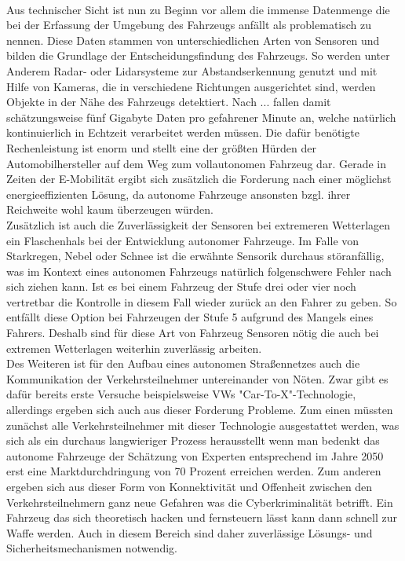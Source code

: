 \documentclass[10pt,a4paper]{article}
\begin{document}
\\
Aus technischer Sicht ist nun zu Beginn vor allem die immense Datenmenge die bei der Erfassung der Umgebung des Fahrzeugs anfällt als problematisch zu nennen. Diese Daten stammen von unterschiedlichen Arten von Sensoren und bilden die Grundlage der Entscheidungsfindung des Fahrzeugs. So werden unter Anderem Radar- oder Lidarsysteme zur Abstandserkennung genutzt und mit Hilfe von Kameras, die in verschiedene Richtungen ausgerichtet sind, werden Objekte in der Nähe des Fahrzeugs detektiert. Nach ... fallen damit schätzungsweise fünf Gigabyte Daten pro gefahrener Minute an, welche natürlich kontinuierlich in Echtzeit verarbeitet werden müssen. Die dafür benötigte Rechenleistung ist enorm und stellt eine der größten Hürden der Automobilhersteller auf dem Weg zum vollautonomen Fahrzeug dar. Gerade in Zeiten der E-Mobilität ergibt sich zusätzlich die Forderung nach einer möglichst energieeffizienten Lösung, da autonome Fahrzeuge ansonsten bzgl. ihrer Reichweite wohl kaum überzeugen würden. 
\\
Zusätzlich ist auch die Zuverlässigkeit der Sensoren bei extremeren Wetterlagen ein Flaschenhals bei der Entwicklung autonomer Fahrzeuge. Im Falle von Starkregen, Nebel oder Schnee ist die erwähnte Sensorik durchaus störanfällig, was im Kontext eines autonomen Fahrzeugs natürlich folgenschwere Fehler nach sich ziehen kann.  Ist es bei einem Fahrzeug der Stufe drei oder vier noch vertretbar die Kontrolle in diesem Fall wieder zurück an den Fahrer zu geben. So entfällt diese Option bei Fahrzeugen der Stufe 5 aufgrund des Mangels eines Fahrers. Deshalb sind für diese Art von Fahrzeug Sensoren nötig die auch bei extremen Wetterlagen weiterhin zuverlässig arbeiten.
\\
Des Weiteren ist für den Aufbau eines autonomen Straßennetzes auch die Kommunikation der Verkehrsteilnehmer untereinander von Nöten. Zwar gibt es dafür bereits erste Versuche beispielsweise VWs "Car-To-X"-Technologie, allerdings ergeben sich auch aus dieser Forderung Probleme. Zum einen müssten zunächst alle Verkehrsteilnehmer mit dieser Technologie ausgestattet werden, was sich als ein durchaus langwieriger Prozess herausstellt wenn man bedenkt das autonome Fahrzeuge der Schätzung von Experten entsprechend im Jahre 2050 erst eine Marktdurchdringung von 70 Prozent erreichen werden. Zum anderen ergeben sich aus dieser Form von Konnektivität und Offenheit zwischen den Verkehrsteilnehmern ganz neue Gefahren was die Cyberkriminalität betrifft. Ein Fahrzeug das sich theoretisch hacken und fernsteuern lässt kann dann schnell zur Waffe werden. Auch in diesem Bereich sind daher zuverlässige Lösungs- und Sicherheitsmechanismen notwendig.\cite{Test}
\end{document}
